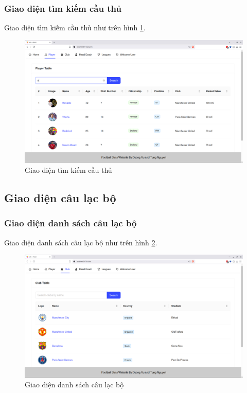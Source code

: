 \documentclass[../BTL.tex]{subfiles}
\begin{document}
\subsubsection{Giao diện tìm kiếm cầu thủ}
Giao diện tìm kiếm cầu thủ như trên hình \ref{fig:user-player-search}.
\begin{figure}
\centering
\includegraphics[width=1\linewidth]{Hinhve/user-player-search.png}
\caption{Giao diện tìm kiếm cầu thủ}
\label{fig:user-player-search}
\end{figure}
\subsection{ Giao diện câu lạc bộ}
\subsubsection{Giao diện danh sách câu lạc bộ}
Giao diện danh sách câu lạc bộ như trên hình \ref{fig:user-club-list}.
\begin{figure}
\centering
\includegraphics[width=1\linewidth]{Hinhve/user-club-list.png}
\caption{Giao diện danh sách câu lạc bộ}
\label{fig:user-club-list}
\end{figure}
\end{document}
